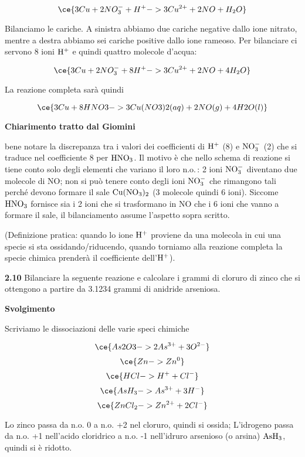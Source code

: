 $$\ce{3Cu + 2NO_3^- + H^+ -> 3Cu^{2+} + 2NO + H_2O}$$

Bilanciamo le cariche. A sinistra abbiamo due cariche negative dallo ione nitrato, mentre a destra abbiamo sei cariche positive dallo ione rameoso. Per bilanciare ci servono 8 ioni $\rm H^+$ e quindi quattro molecole d'acqua:

$$\ce{3Cu + 2NO_3^- + 8H^+ -> 3Cu^{2+} + 2NO + 4H_2O}$$

La reazione completa sarà quindi

$$\ce{3Cu + 8HNO3 -> 3Cu(NO3)2(aq) + 2NO(g) + 4H2O(l)}$$

\textbf{Chiarimento tratto dal Giomini}

\E bene notare la discrepanza tra i valori dei coefficienti di $\rm H^+$ (8) e $\rm NO_3^-$ (2) che si traduce nel coefficiente 8 per $\rm HNO_3$. Il motivo è che nello schema di reazione si tiene conto solo degli elementi che variano il loro n.o.\,: 2 ioni $\rm NO_3^-$ diventano due molecole di NO; non si può tenere conto degli ioni $\rm NO_3^-$ che rimangono tali perché devono formare il sale $\rm Cu(NO_3)_2$ (3 molecole quindi 6 ioni). Siccome $\rm HNO_3$ fornisce sia i 2 ioni che si trasformano in NO che i 6 ioni che vanno a formare il sale, il bilanciamento assume l'aspetto sopra scritto.

(Definizione pratica: quando lo ione $\rm H^+$ proviene da una molecola in cui una specie si sta ossidando/riducendo, quando torniamo alla reazione completa la specie chimica prenderà il coefficiente dell'$\rm H^+$).

\vspace{0.2cm}\textbf{2.10} Bilanciare la seguente reazione e calcolare i grammi di cloruro di zinco che si ottengono a partire da 3.1234 grammi di anidride arseniosa.

\begin{center}
\end{center}

\large\textbf{Svolgimento}\normalsize

\vspace{0.2cm}Scriviamo le dissociazioni delle varie speci chimiche

$$\ce{As2O3 -> 2As^{3+} + 3O^{2-}}$$
$$\ce{Zn -> Zn^0}$$
$$\ce{HCl -> H^+ + Cl^-}$$
$$\ce{AsH_3 -> As^{3+} + 3H^{-}}$$
$$\ce{ZnCl_2 -> Zn^{2+} + 2Cl^{-}}$$

Lo zinco passa da n.o. 0 a n.o. +2 nel cloruro, quindi si ossida; L'idrogeno passa da n.o. +1 nell'acido cloridrico a n.o. -1 nell'idruro arsenioso (o arsina) $\rm AsH_3$, quindi si è ridotto.

